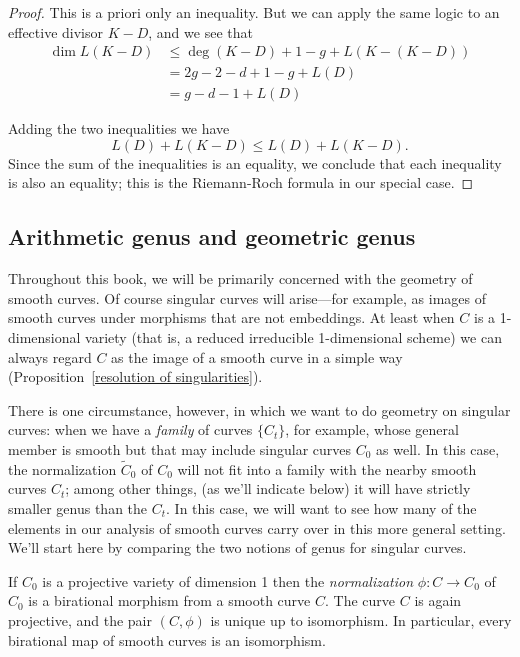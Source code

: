 \begin{proof}
This is a priori only an inequality. But we can apply the same logic to an effective divisor $K-D$, and we see that
\begin{align*}
\dim L(K-D) &\leq \deg(K-D) + 1 - g + L(K - (K-D)) \\
& = 2g - 2 - d + 1 - g  + L(D) \\
&= g - d - 1 + L(D)
\end{align*}

Adding the two inequalities we have
$$
L(D) + L(K-D) \leq L(D) + L(K-D).
$$
Since the sum of the inequalities is an equality, we conclude that each inequality is also an equality; this is the Riemann-Roch formula
in our special case.
\end{proof}

\subsection{Arithmetic genus and geometric genus}

Throughout this book, we will be primarily concerned with the geometry of smooth curves. Of course singular curves will arise---for example, as images of smooth curves under morphisms that are not embeddings. At least when $C$ is a 1-dimensional variety (that is, a 
reduced irreducible 1-dimensional scheme) we can always regard $C$ as the image of a smooth curve in a simple way (Proposition~\ref{resolution of singularities}).

There is one circumstance, however, in which we want to do geometry on singular curves: when we have a \emph{family} of curves $\{C_t\}$, for example, whose general member is smooth but that may include singular curves $C_0$ as well. In this case, the  normalization $\tilde C_0$ of $C_0$ will not fit into a family with the nearby smooth curves $C_t$; among other things, (as we'll indicate below) it will have strictly smaller genus than the $C_t$. In this case, we will want to see how many of the elements in our analysis of smooth curves carry over in this more general setting. We'll start here by comparing the two notions of genus for singular curves.



\begin{proposition}\label{resolution of singularities}
If $C_0$ is a projective variety of dimension 1 then the \emph{normalization} $\phi: C \to C_0$ of $C_0$ is a birational
morphism from a smooth curve $C$. The curve $C$ is again projective, and the pair $(C, \phi)$ is
unique up to  isomorphism. In particular, every birational map of smooth curves is an isomorphism.
\end{proposition}
 
